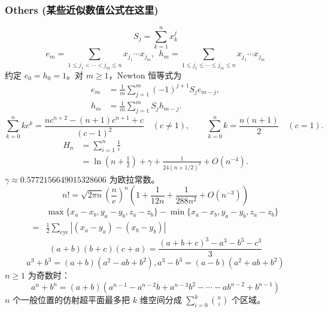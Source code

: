 \begin{footnotesize}
\subsubsection{Others (某些近似数值公式在这里)}
\[ S_j = \sum_{k=1}^nx_k^j \]
\[ e_m = \sum_{1\leq j_1 < \cdots < j_m \leq n} x_{j_1}\cdots x_{j_m},\ \ h_m = \sum_{1\leq j_1 \leq \cdots \leq j_m \leq n} x_{j_1}\cdots x_{j_m} \]
约定 $e_0=h_0=1$。对 $m\ge1$，Newton 恒等式为
\[\begin{aligned}
e_m&=\frac1m\sum_{j=1}^m(-1)^{j+1}S_je_{m-j},\\
h_m&=\frac1m\sum_{j=1}^mS_jh_{m-j}.
\end{aligned}\]
\[ \sum_{k=0}^nkc^k = \frac{nc^{n+2}-(n+1)c^{n+1}+c}{(c-1)^2}\quad(c\ne1), \qquad
\sum_{k=0}^n k=\frac{n(n+1)}2\quad(c=1). \]
\[\begin{aligned}
H_n&=\sum_{i=1}^n\frac1i\\
&=\ln\left(n+\frac12\right)+\gamma+\frac{1}{24(n+1/2)^2}+O(n^{-4}).
\end{aligned}\]
$\gamma\approx0.5772156649015328606$ 为欧拉常数。
\[ n! = \sqrt{2\pi n}\left(\frac{n}{e}\right)^n
\left(1+\frac{1}{12n}+\frac{1}{288n^2}+O(n^{-3})\right) \]
\[ \begin{aligned}
 &\max{\{x_a-x_b, y_a-y_b, z_a-z_b\}} - \min{\{x_a-x_b, y_a-y_b, z_a-z_b\}} \\
=& \frac{1}{2}\sum_{\mathrm{cyc}}\left| (x_a-y_a)-(x_b-y_b) \right|
\end{aligned} \]
\[ (a+b)(b+c)(c+a) = \frac{(a+b+c)^3 - a^3 - b^3 - c^3}{3} \]
\[ a^3+b^3=(a+b)(a^2-ab+b^2),a^3-b^3=(a-b)(a^2+ab+b^2) \]
$n\ge1$ 为奇数时：
\[ a^n+b^n=(a+b)(a^{n-1}-a^{n-2}b+a^{n-3}b^2-\cdots-ab^{n-2}+b^{n-1})\]
$n$ 个一般位置的仿射超平面最多把 $k$ 维空间分成
$\sum_{i=0}^{k}\binom ni$ 个区域。
\end{footnotesize}
